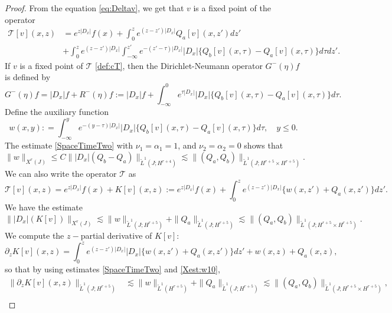 \documentclass[12pt]{amsart}
\theoremstyle{definition}
\numberwithin{equation}{section}
\newcommand{\p}{\partial}
\newcommand{\wt}{\widetilde}
\begin{document}
\begin{proof}
From the equation \eqref{eq:Deltav}, we get that $v$ is a fixed point of the operator 
\begin{equation}\label{def:cT}
\begin{aligned}
\mathcal{T}[v](x, z)&=e^{z|D_x|}f(x)+\int_0^ze^{(z-z')|D_x|}Q_a[v](x, z')dz'\\
&+\int_0^ze^{(z-z')|D_x|}\int_{-\infty}^{z'}e^{-(z'-\tau)|D_x|}|D_x|\{Q_b[v](x, \tau)-Q_a[v](x, \tau)\}d\tau dz'.
\end{aligned}
\end{equation}
If $v$  is a fixed point of $\mathcal{T}$ \eqref{def:cT}, then 
 the Dirichlet-Neumann operator $G^-(\eta)f$ is defined by
\begin{equation}\label{def:R}
G^-(\eta)f=|D_x|f+R^-(\eta)f:=|D_x|f+\int_{-\infty}^0e^{\tau |D_x|}|D_x|\{Q_b[v](x, \tau)-Q_a[v](x, \tau)\}d\tau.
\end{equation}
Define the auxiliary function
\begin{equation*}
    w(x,y) : = \int_{-\infty}^ye^{-(y-\tau)|D_x|}|D_x|\{Q_b[v](x, \tau)-Q_a[v](x, \tau)\}d\tau,\quad y\le 0.
\end{equation*}
The estimate \eqref{SpaceTimeTwo} with $\nu_1 = \alpha_1 = 1$, and $\nu_2 = \alpha_2 = 0$ shows that
\begin{equation}\label{Xest:w10}
 \| w\|_{X^r(J)}\le C \| |D_x|(Q_b-Q_a)\|_{\widetilde{L}^1(J;  H^{r+4})}\lesssim \| (Q_a, Q_b)\|_{\widetilde{L} ^1(J; H^{r+5}\times H^{r+5})}.
\end{equation}
We can also write the operator $\mathcal{T}$ as 
\begin{equation*}%
\mathcal{T}[v](x, z)=e^{z|D_x|}f(x)+K[v](x, z):=e^{z|D_x|}f(x)+\int_0^ze^{(z-z')|D_x|}\{w(x, z')+Q_a(x, z')\}dz'.
\end{equation*}
We have the estimate
\begin{equation*}
 \||D_x| (K[v]) \|_{X^r(J)} \lesssim \| w\|_{\widetilde{L} ^1(J; H^{r+5})} + \|Q_a\|_{\widetilde{L} ^1(J; H^{r+5})} \lesssim \| (Q_a, Q_b)\|_{\widetilde{L} ^1(J; H^{r+5}\times H^{r+5})}.
\end{equation*}
We compute the $z-$partial derivative of $K[v]$:
\begin{equation*}
\label{form:dzK}
\p_z K[v](x, z)=\int_0^ze^{(z-z')|D_x|}|D_x|\{w(x, z')+Q_a(x, z')\}dz'+w(x, z)+Q_a(x, z),
\end{equation*}
so that by using estimates \eqref{SpaceTimeTwo} and \eqref{Xest:w10}, 
\begin{align*}
 \|\p_z K[v](x, z)\|_{\wt L^1(J; H^{r+5})}&\lesssim\| w\|_{\wt L^1(H^{r+5})}+\| Q_a\|_{\wt L^1(J; H^{r+5})}\lesssim \| (Q_a, Q_b)\|_{\wt L^1(J; H^{r+5}\times H^{r+5})}, \\

\end{align*}
\end{proof}
\end{document}

